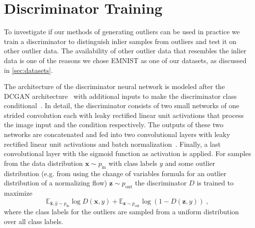 \section{Discriminator Training}%
\label{sec:discriminator_training}

To investigate if our methods of generating outliers can be used in practice we
train a discriminator to distinguish inlier samples from outliers and test it
on other outlier data. The availability of other outlier data that resembles
the inlier data is one of the reasons we chose EMNIST as one of our datasets,
as discussed in \autoref{sec:datasets}.

The architecture of the discriminator neural network is modeled after the
DCGAN architecture~\citep{radfordUnsupervisedRepresentationLearning2016} with
additional inputs to make the discriminator class
conditional~\citep{mirzaConditionalGenerativeAdversarial2014}. In detail, the
discriminator consists of two small networks of one strided convolution each
with leaky rectified linear unit activations that process the image input and
the condition respectively. The outputs of these two networks are concatenated
and fed into two convolutional layers with leaky rectified linear unit
activations and batch
normalization~\citep{ioffeBatchNormalizationAccelerating2015}. Finally, a last
convolutional layer with the sigmoid function as activation is applied.
For samples from the data distribution $\mathbf{x} \sim p_{\mathrm{in}}$ with class
labels $y$ and some outlier distribution (e.g. from using the change of variables formula
for an outlier distribution of a normalizing flow) $\mathbf{z} \sim p_{\mathrm{out}}$
the discriminator $D$ is trained to maximize
\begin{equation}
	\mathbb{E}_{\hat{\mathbf{x}}, \hat{y} \sim p_{\mathrm{in}}}
        \log D(\mathbf{x}, y) +
	\mathbb{E}_{\mathbf{z} \sim p_{\mathrm{out}}} \log ( 1 - D(\mathbf{z},
        y) )\;,
\end{equation}
where the class labels for the outliers are sampled from a uniform distribution
over all class labels.

